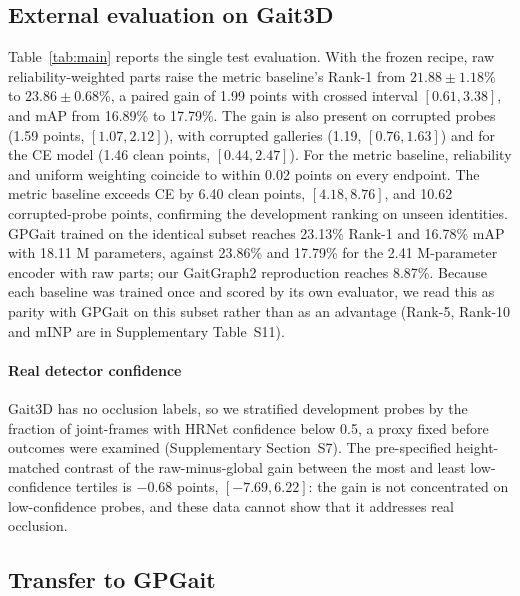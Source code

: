 \documentclass[review,12pt]{elsarticle}
\begin{document}
\subsection{External evaluation on Gait3D}

Table~\ref{tab:main} reports the single test evaluation. With the frozen
recipe, raw reliability-weighted parts raise the metric baseline's Rank-1 from
$21.88\pm1.18$\% to $23.86\pm0.68$\%, a paired gain of 1.99 points with crossed
interval $[0.61,3.38]$, and mAP from 16.89\% to 17.79\%. The gain is also present
on corrupted probes (1.59 points, $[1.07,2.12]$), with corrupted galleries
(1.19, $[0.76,1.63]$) and for the CE model (1.46 clean points,
$[0.44,2.47]$). For the metric baseline, reliability and uniform weighting
coincide to within 0.02 points on every endpoint. The metric baseline exceeds CE by 6.40 clean points,
$[4.18,8.76]$, and 10.62 corrupted-probe points, confirming the development
ranking on unseen identities. GPGait trained on the identical subset reaches
23.13\% Rank-1 and 16.78\% mAP with 18.11 M parameters, against 23.86\% and
17.79\% for the 2.41 M-parameter encoder with raw parts; our GaitGraph2
reproduction reaches 8.87\%. Because each baseline was trained once and scored
by its own evaluator, we read this as parity with GPGait on this subset rather
than as an advantage (Rank-5, Rank-10 and mINP are in Supplementary
Table~S11).

\paragraph{Real detector confidence}
Gait3D has no occlusion labels, so we stratified development probes by the
fraction of joint-frames with HRNet confidence below 0.5, a proxy fixed before
outcomes were examined (Supplementary Section~S7). The pre-specified
height-matched contrast of the raw-minus-global gain between the most and least
low-confidence tertiles is $-0.68$ points, $[-7.69,6.22]$: the gain is not
concentrated on low-confidence probes, and these data cannot show that it
addresses real occlusion.

\subsection{Transfer to GPGait}
\end{document}
